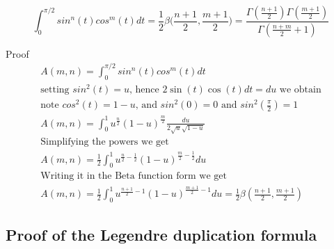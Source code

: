 \documentclass[a4paper]{article}
\begin{document}
    \begin{theorem}
        \begin{equation}
            \boxed{
                \int_{0}^{\pi/2} sin^{n}(t) cos^{m}(t) dt = \frac{1}{2} \beta \Big( \frac{n+1}{2}, \frac{m+1}{2} \Big)
                =
                \frac{\Gamma(\frac{n+1}{2}) \Gamma(\frac{m+1}{2})}{\Gamma(\frac{n+m}{2} + 1)}
            }\label{gf:eq:equation25}
        \end{equation}

        Proof
        \\
        \begin{gather*}
            A(m, n) = \int_{0}^{\pi/2} sin^{n}(t) cos^{m}(t) dt
            \\
            \text{setting $sin^{2}(t) = u$, hence $2 \sin(t) \cos(t) dt = du$ we obtain}
            \\
            \text{note $cos^{2}(t) = 1-u$, and $sin^{2}(0) = 0$ and $sin^{2} \left( \frac{\pi}{2} \right) = 1$}
            \\
            A(m, n) = \int_{0}^{1} u^{\frac{n}{2}} (1-u)^{\frac{m}{2}} \frac{du}{2 \sqrt{u} \sqrt{1-u}}
            \\
            \text{Simplifying the powers we get}
            \\
            A(m, n) = \frac{1}{2} \int_{0}^{1} u^{\frac{n}{2} -\frac{1}{2}} (1-u)^{\frac{m}{2}-\frac{1}{2}} du
            \\
            \text{Writing it in the Beta function form we get}
            \\
            A(m, n) = \frac{1}{2} \int_{0}^{1} u^{\frac{n+1}{2}- 1} (1-u)^{\frac{m+1}{2} -1} du = \frac{1}{2} \beta(\frac{n+1}{2}, \frac{m+1}{2})
        \end{gather*}
    \end{theorem}

    \subsection{Proof of the Legendre duplication formula} \label{gf:subsec:proof-of-leg-dup}
\end{document}
